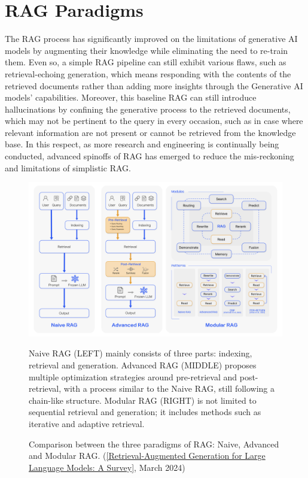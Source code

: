 \section{RAG Paradigms}
The RAG process has significantly improved on the limitations of generative AI models by augmenting their knowledge while eliminating the need to re-train them. Even so, a simple RAG pipeline can still exhibit various flaws, such as retrieval-echoing generation, which means responding with the contents of the retrieved documents rather than adding more insights through the Generative AI models' capabilities. Moreover, this baseline RAG can still introduce hallucinations by confining the generative process to the retrieved documents, which may not be pertinent to the query in every occasion, such as in case where relevant information are not present or cannot be retrieved from the knowledge base. In this respect, as more research and engineering is continually being conducted, advanced spinoffs of RAG has emerged to reduce the mis-reckoning and limitations of simplistic RAG.
\begin{figure}[H]
    \centering
    \includegraphics[width=\linewidth]{./figures/RAG_FrameCompre_eng.png}
    \caption{Comparison between the three paradigms of RAG: Naive, Advanced and Modular RAG. (\href{https://arxiv.org/html/2312.10997v5}{[Retrieval-Augmented Generation for Large Language Models: A Survey]}, March 2024)}
    \begin{flushleft}
        \small Naive RAG (LEFT)  mainly consists of three parts: indexing, retrieval and generation. Advanced RAG (MIDDLE) proposes multiple optimization strategies around pre-retrieval and post-retrieval, with a process similar to the Naive RAG, still following a chain-like structure. Modular RAG (RIGHT) is not limited to sequential retrieval and generation; it includes methods such as iterative and adaptive retrieval.
    \end{flushleft}
\end{figure}
